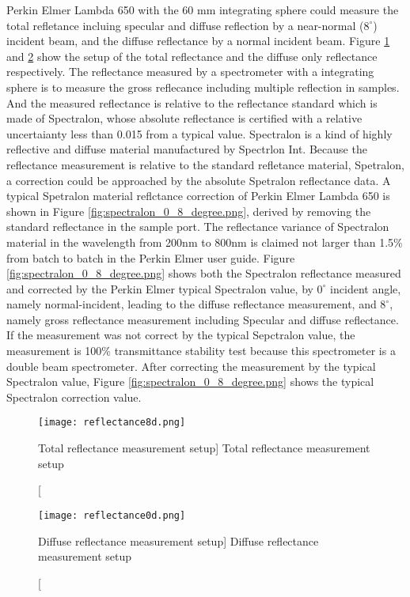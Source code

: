 Perkin Elmer Lambda 650 with the 60 mm integrating sphere could measure
the total refletance incluing specular and diffuse reflection by a near-normal ($8^\circ$) incident beam, and
the diffuse reflectance by a normal incident beam.
Figure \ref{fig:reflectance8d.png} and \ref{fig:reflectance0d.png} show the setup of the total reflectance and the diffuse only
reflectance respectively.
The reflectance measured by a spectrometer with a integrating sphere is to measure the gross reflecance including multiple reflection in samples.
And the measured reflectance is relative to the reflectance standard which is made of Spectralon, whose absolute reflectance is certified with
a relative uncertaianty less than 0.015 from a typical value. Spectralon is a kind of highly reflective and diffuse material manufactured by Spectrlon Int.
Because the reflectance measurement is relative to the standard refletance material, Spetralon,
a correction could be approached by the absolute Spetralon reflectance data.
A typical Spetralon material reflctance correction of Perkin Elmer Lambda 650 is
shown in Figure \ref{fig:spectralon_0_8_degree.png}, derived by removing the standard
reflectance in the sample port. The reflectance variance of Spectralon material in the wavelength from 200nm to 800nm
is claimed not larger than 1.5\% from batch to batch
in the Perkin Elmer user guide.
Figure \ref{fig:spectralon_0_8_degree.png} shows both the Spectralon reflectance measured and corrected by the Perkin Elmer typical Spectralon value,
by $0^\circ$ incident angle, namely normal-incident, leading to the diffuse reflectance measurement,
and $8^\circ$, namely gross reflectance measurement including Specular and diffuse reflectance.
If the measurement was not correct by the typical Sepctralon value, the measurement is 100\% transmittance stability test
because this spectrometer is a double beam spectrometer.
After correcting the measurement by the typical Spectralon value, Figure \ref{fig:spectralon_0_8_degree.png} shows the typical Spectralon correction value.


\begin{figure}
    \centering
    \texttt{[image: reflectance8d.png]}
    \caption
    [Total reflectance measurement setup]
    {Total reflectance measurement setup}
    \label{fig:reflectance8d.png}
    \end{figure}


\begin{figure}
    \centering
    \texttt{[image: reflectance0d.png]}
    \caption
    [Diffuse reflectance measurement setup]
    {Diffuse reflectance measurement setup}
    \label{fig:reflectance0d.png}
    \end{figure}


